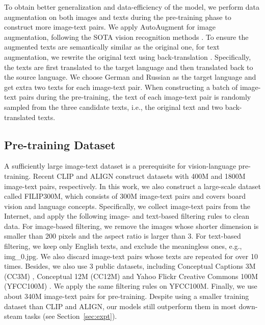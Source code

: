 \label{sec:augmentation}
To obtain better generalization and data-efficiency of the model, we perform data augmentation on both images and texts during the pre-training phase to construct more image-text pairs. 
We apply AutoAugment \citep{krizhevsky2012imagenet,sato2015apac,cubuk2019autoaugment,hoffer2020augment} for image augmentation, following the SOTA vision recognition methods \citep{touvron2021training,xie2020self}.
To ensure the augmented texts are semantically similar as the original one, for
text augmentation, we rewrite the original text using 
back-translation \citep{xie2020unsupervised,sennrich2016improving}.
Specifically,
the texts are first translated to the target language and then translated back to the source language. 
We choose German and Russian as the target language and get extra two texts for each image-text pair. 
When constructing a batch of image-text pairs during the pre-training, the text of each image-text pair is randomly sampled from the three candidate texts, i.e., the original text and two back-translated texts.


\vspace{-1mm}
\subsection{Pre-training Dataset}
\label{sec:dataset_construction}

A sufficiently large image-text dataset is a prerequisite for vision-language pre-training. 
Recent CLIP \citep{radford2021learning} and ALIGN \citep{jia2021scaling} construct datasets with 400M and 1800M image-text pairs, respectively. 
In this work, we also construct a large-scale dataset called FILIP300M, which consists of 300M image-text pairs and covers board vision and language concepts.
Specifically, we collect image-text pairs from the Internet,
and apply the following image- and text-based filtering rules to clean data.
For image-based filtering, we remove the images whose shorter dimension is smaller than 200 pixels and the aspect ratio is larger than 3. 
For text-based filtering, we keep only English texts, and exclude the meaningless ones, e.g., img\_0.jpg. 
We also discard image-text pairs whose texts are repeated for over 10 times. 
Besides, we also use 3 public datasets, including Conceptual Captions 3M (CC3M) \citep{sharma2018conceptual}, Conceptual 12M (CC12M) \citep{changpinyo2021cc12m} and Yahoo Flickr Creative Commons 100M (YFCC100M) \citep{thomee2016yfcc100m}. We apply the same filtering rules on YFCC100M. Finally, we use about 340M image-text pairs for pre-training. 
Despite using a smaller training dataset than CLIP and ALIGN, our models still outperform them in most down-steam tasks (see Section~\ref{sec:expt}).


